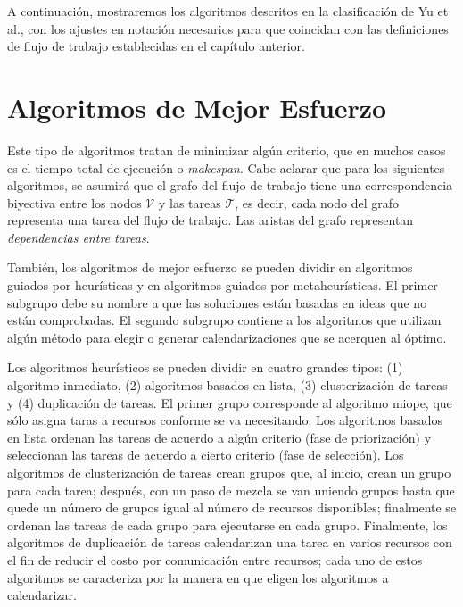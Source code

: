 A continuación, mostraremos los algoritmos descritos en la clasificación de Yu et al., con los ajustes en notación necesarios para que coincidan con las definiciones de flujo de trabajo establecidas en el capítulo anterior.

\section{Algoritmos de Mejor Esfuerzo}
Este tipo de algoritmos tratan de minimizar algún criterio, que en muchos casos es el tiempo total de ejecución o \emph{makespan}. Cabe aclarar que para los siguientes algoritmos, se asumirá que el grafo del flujo de trabajo tiene una correspondencia biyectiva entre los nodos $\mathcal{V}$ y las tareas $\mathcal{T}$, es decir, cada nodo del grafo representa una tarea del flujo de trabajo. Las aristas del grafo representan \emph{dependencias entre tareas}.

También, los algoritmos de mejor esfuerzo se pueden dividir en algoritmos guiados por heurísticas y en algoritmos guiados por metaheurísticas. El primer subgrupo debe su nombre a que las soluciones están basadas en ideas que no están comprobadas. El segundo subgrupo contiene a los algoritmos que utilizan algún método para elegir o generar calendarizaciones que se acerquen al óptimo.

Los algoritmos heurísticos se pueden dividir en cuatro grandes tipos: (1) algoritmo inmediato, (2) algoritmos basados en lista, (3) clusterización de tareas y (4) duplicación de tareas. El primer grupo corresponde al algoritmo miope, que sólo asigna taras a recursos conforme se va necesitando. Los algoritmos basados en lista ordenan las tareas de acuerdo a algún criterio (fase de priorización) y seleccionan las tareas de acuerdo a cierto criterio (fase de selección). Los algoritmos de clusterización de tareas crean grupos que, al inicio, crean un grupo para cada tarea; después, con un paso de mezcla se van uniendo grupos hasta que quede un número de grupos igual al número de recursos disponibles; finalmente se ordenan las tareas de cada grupo para ejecutarse en cada grupo. Finalmente, los algoritmos de duplicación de tareas calendarizan una tarea en varios recursos con el fin de reducir el costo por comunicación entre recursos; cada uno de estos algoritmos se caracteriza por la manera en que eligen los algoritmos a calendarizar.

